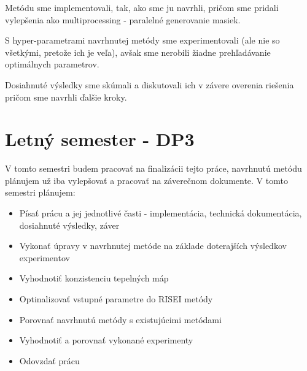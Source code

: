     Metódu sme implementovali, tak, ako sme ju navrhli, pričom sme pridali vylepšenia ako multiprocessing - paralelné generovanie masiek.

    S hyper-parametrami navrhnutej metódy sme experimentovali (ale nie so všetkými, pretože ich je veľa), avšak sme nerobili žiadne prehľadávanie optimálnych parametrov.

    Dosiahnuté výsledky sme skúmali a diskutovali ich v závere overenia riešenia pričom sme navrhli ďalšie kroky.


\section{Letný semester - DP3}

    
    V tomto semestri budem pracovať na finalizácii tejto práce, navrhnutú metódu plánujem už iba vylepšovať a pracovať na záverečnom dokumente. V tomto semestri plánujem:
        
    \begin{itemize}
        \item Písať prácu a jej jednotlivé časti - implementácia, technická dokumentácia, dosiahnuté výsledky, záver
        \item Vykonať úpravy v navrhnutej metóde na základe doterajších výsledkov experimentov
        \item Vyhodnotiť konzistenciu tepelných máp
        \item Optinalizovať vstupné parametre do RISEI metódy
        \item Porovnať navrhnutú metódy s existujúcimi metódami
        \item Vyhodnotiť a porovnať vykonané experimenty
        \item Odovzdať prácu
    \end{itemize}
    
    